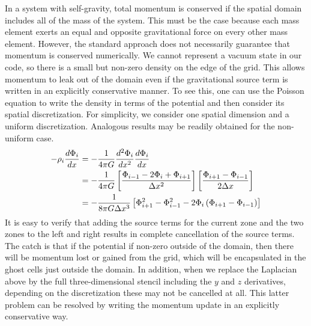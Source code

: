 \documentclass[12pt]{article}
\begin{document}
In a system with self-gravity, total momentum is conserved if the spatial domain
includes all of the mass of the system. This must be the 
case because each mass element exerts an equal and opposite gravitational force 
on every other mass element. However, the standard approach does not necessarily
guarantee that momentum is conserved numerically. We cannot represent a vacuum state 
in our code, so there is a small but non-zero density on the edge of the grid. 
This allows momentum to leak out of the domain even if the gravitational source term 
is written in an explicitly conservative manner. To see this, one can use the Poisson equation to write the 
density in terms of the potential and then consider its spatial discretization. For simplicity,
we consider one spatial dimension and a uniform discretization. Analogous results 
may be readily obtained for the non-uniform case.
\begin{align}
  -\rho_{i}  \frac{d\Phi_{i}}{dx} &= -\frac{1}{4\pi G} \frac{d^2\Phi_i}{dx^2} \frac{d \Phi_i}{dx} \notag \\
  &= -\frac{1}{4\pi G} \left[\frac{\Phi_{i-1} - 2 \Phi_{i} + \Phi_{i+1}}{\Delta x^2}\right] \left[ \frac{\Phi_{i+1} - \Phi_{i-1}}{2\Delta x} \right] \notag \\
  &= -\frac{1}{8\pi G \Delta x^3} \left[ \Phi_{i+1}^2 - \Phi_{i-1}^2 - 2\Phi_i\left(\Phi_{i+1} - \Phi_{i-1}\right) \right] \label{eq:momentum_discretization}
\end{align}
It is easy to verify that adding the source terms for the current zone and the two zones 
to the left and right results in complete cancellation of the source terms.
The catch is that if the potential if non-zero outside of the domain, then there will be
momentum lost or gained from the grid, which will be encapsulated in the ghost cells
just outside the domain. In addition, when we replace the Laplacian above by the full
three-dimensional stencil including the $y$ and $z$ derivatives, depending on the
discretization these may not be cancelled at all. This latter problem can be resolved by
writing the momentum update in an explicitly conservative way.
\end{document}
